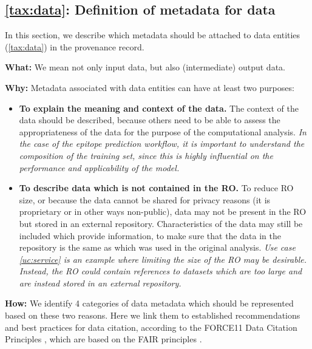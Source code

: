 \subsection{\ref{tax:data}: Definition of metadata for data}
\label{sec:data_reqs}

In this section, we describe which metadata should be attached to data entities (\ref{tax:data}) in the provenance record. 

\textbf{What:} We mean not only input data, but also (intermediate) output data.

\textbf{Why:} Metadata associated with data entities can have at least two purposes:
\begin{itemize}
    \item \textbf{To explain the meaning and context of the data.} The context of the data should be described, because others need to be able to assess the appropriateness of the data for the purpose of the computational analysis. \textit{In the case of the epitope prediction workflow, it is important to understand the composition of the training set, since this is highly influential on the performance and applicability of the model.}
    \item \textbf{To describe data which is not contained in the RO.} To reduce RO size, or because the data cannot be shared for privacy reasons (it is proprietary or in other ways non-public), data may not be present in the RO but stored in an external repository. Characteristics of the data may still be included which provide information, to make sure that the data in the repository is the same as which was used in the original analysis. \textit{Use case \ref{uc:service} is an example where limiting the size of the RO may be desirable. Instead, the RO could contain references to datasets which are too large and are instead stored in an external repository.}
\end{itemize}

\textbf{How:} We identify 4 categories of data metadata which should be represented based on these two reasons. Here we link them to established recommendations and best practices for data citation, according to the FORCE11 Data Citation Principles \cite{datacitationsynthesisgroupJointDeclarationData2014}, which are based on the FAIR principles \cite{wilkinsonFAIRGuidingPrinciples2016}.

